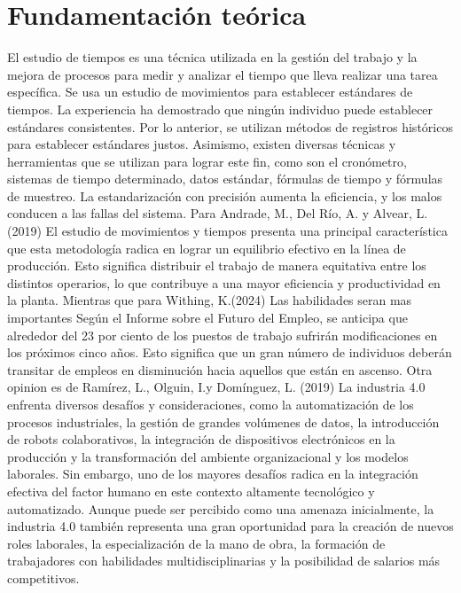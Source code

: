     \section{Fundamentación teórica}
    El estudio de tiempos es una técnica utilizada en la gestión del
    trabajo y la mejora de procesos para medir y analizar el tiempo que
    lleva realizar una tarea específica. Se usa un estudio de movimientos
    para establecer estándares de tiempos. La experiencia ha demostrado
    que ningún individuo puede establecer estándares consistentes.
    Por lo anterior, se utilizan métodos de registros históricos para
    establecer estándares justos. Asimismo, existen diversas técnicas y
    herramientas que se utilizan para lograr este fin, como son el
    cronómetro, sistemas de tiempo determinado, datos estándar,
    fórmulas de tiempo y fórmulas de muestreo. La estandarización con
    precisión aumenta la eficiencia, y los malos conducen a las fallas del
    sistema.
    Para Andrade, M., Del Río, A. y Alvear, L.(2019) El estudio de movimientos y tiempos presenta una principal característica que esta metodología radica en lograr un equilibrio efectivo en la línea de producción. Esto significa distribuir el trabajo de manera equitativa entre los distintos operarios, lo que contribuye a una mayor eficiencia y productividad en la planta.\cite{REF7}
    Mientras que para Withing, K.(2024) 
    Las habilidades seran mas importantes Según el Informe sobre el Futuro del Empleo, se anticipa que alrededor del 23 por ciento de los puestos de trabajo sufrirán modificaciones en los próximos cinco años. Esto significa que un gran número de individuos deberán transitar de empleos en disminución hacia aquellos que están en ascenso.\cite{REF8}
    Otra opinion es de Ramírez, L., Olguin, I.y Domínguez, L. (2019) La industria 4.0 enfrenta diversos desafíos y consideraciones, como la automatización de los procesos industriales, la gestión de grandes volúmenes de datos, la introducción de robots colaborativos, la integración de dispositivos electrónicos en la producción y la transformación del ambiente organizacional y los modelos laborales. Sin embargo, uno de los mayores desafíos radica en la integración efectiva del factor humano en este contexto altamente tecnológico y automatizado. Aunque puede ser percibido como una amenaza inicialmente, la industria 4.0 también representa una gran oportunidad para la creación de nuevos roles laborales, la especialización de la mano de obra, la formación de trabajadores con habilidades multidisciplinarias y la posibilidad de salarios más competitivos.\cite{REF9}
    
